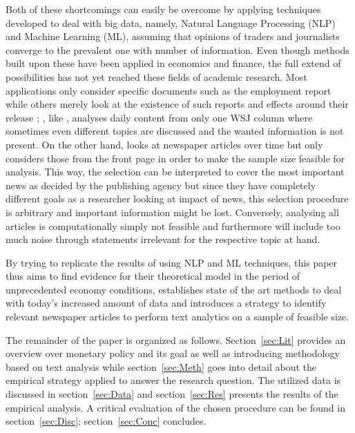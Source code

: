 Both of these shortcomings can easily be overcome by applying techniques developed to deal with big data, namely, Natural Language Processing (NLP) and Machine Learning (ML), assuming that opinions of traders and journalists converge to the prevalent one with number of information. Even though methods built upon these have been applied in economics and finance, the full extend of possibilities has not yet reached these fields of academic research. Most applications only consider specific documents such as the employment report \parencite{Hautsch.2002,Hess.2004} while others merely look at the existence of such reports and effects around their release \parencite{Bomfim.2003,Hautsch.2011,Lucca.2015}; \textcite{Tetlock.2007}, like \textcite{Ellingsen.2001}, analyses daily content from only one WSJ column where sometimes even different topics are discussed and the wanted information is not present. On the other hand, \textcite{Manela.2017} looks at newspaper articles over time but only considers those from the front page in order to make the sample size feasible for analysis. This way, the selection can be interpreted to cover the most important news as decided by the publishing agency but since they have completely different goals as a researcher looking at impact of news, this selection procedure is arbitrary and important information might be lost. Conversely, analysing all articles is computationally simply not feasible and furthermore will include too much noise through statements irrelevant for the respective topic at hand.

By trying to replicate the results of \textcite{Ellingsen.2001} using NLP and ML techniques, this paper thus aims to find evidence for their theoretical model in the period of unprecedented economy conditions, establishes state of the art methods to deal with today's increased amount of data and introduces a strategy to identify relevant newspaper articles to perform text analytics on a sample of feasible size. 

The remainder of the paper is organized as follows. Section~\ref{sec:Lit} provides an overview over monetary policy and its goal as well as introducing methodology based on text analysis while section~\ref{sec:Meth} goes into detail about the empirical strategy applied to answer the research question. The utilized data is discussed in section~\ref{sec:Data} and section~\ref{sec:Res} presents the results of the empirical analysis. A critical evaluation of the chosen procedure can be found in section~\ref{sec:Disc}; section~\ref{sec:Conc} concludes.
%
